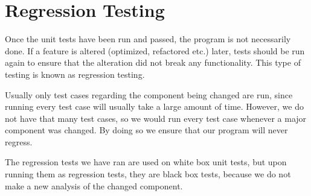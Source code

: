 \section{Regression Testing}
Once the unit tests have been run and passed, the program is not necessarily done.
If a feature is altered (optimized, refactored etc.) later, tests should be run again to ensure that the alteration did not break any functionality. This type of testing is known as regression testing.

Usually only test cases regarding the component being changed are run, since running every test case will usually take a large amount of time.
However, we do not have that many test cases, so we would run every test case whenever a major component was changed.
By doing so we ensure that our program will never regress.

The regression tests we have ran are used on white box unit tests, but upon running them as regression tests, they are black box tests, because we do not make a new analysis of the changed component.
